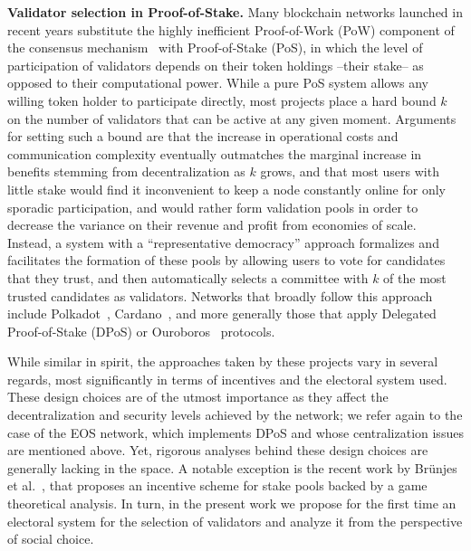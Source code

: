 \textbf{Validator selection in Proof-of-Stake.}
Many blockchain networks launched in recent years substitute the highly inefficient Proof-of-Work (PoW) component of the consensus mechanism~\cite{nakamoto2019bitcoin} with Proof-of-Stake (PoS), in which the level of participation of validators depends on their token holdings --their stake-- as opposed to their computational power. 
While a pure PoS system allows any willing token holder to participate directly, most projects place a hard bound $k$ on the number of validators that can be active at any given moment. 
Arguments for setting such a bound are that the increase in operational costs and communication complexity eventually outmatches the marginal increase in benefits stemming from decentralization as $k$ grows, and that most users with little stake would find it inconvenient to keep a node constantly online for only sporadic participation, and would rather form validation pools in order to decrease the variance on their revenue and profit from economies of scale. %
%
Instead, a system with a ``representative democracy'' approach formalizes and facilitates the formation of these pools by allowing users to vote for candidates that they trust, and then automatically selects a committee with $k$ of the most trusted candidates as validators. Networks that broadly follow this approach include Polkadot~\cite{burdges2020overview}, Cardano~\cite{brunjes2020reward}, and more generally those that apply Delegated Proof-of-Stake (DPoS) or Ouroboros~\cite{kiayias2017ouroboros} protocols. 

While similar in spirit, the approaches taken by these projects vary in several regards, most significantly in terms of incentives and the electoral system used. These design choices are of the utmost importance as they affect the decentralization and security levels achieved by the network; we refer again to the case of the EOS network, which implements DPoS and whose centralization issues are mentioned above. 
Yet, rigorous analyses behind these design choices are generally lacking in the space. 
A notable exception is the recent work by Br{\"u}njes et al.~\cite{brunjes2020reward}, that proposes an incentive scheme for stake pools backed by a game theoretical analysis. In turn, in the present work we propose for the first time an electoral system for the selection of validators and analyze it from the perspective of social choice. 

